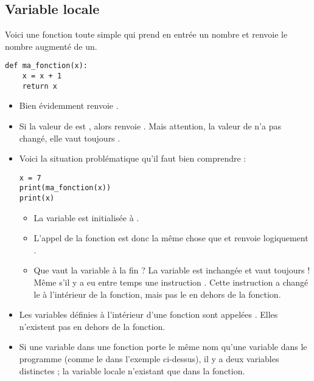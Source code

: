 \documentclass[11pt,class=report,crop=false]{standalone}
\begin{document}
\subsection{Variable locale}


Voici une fonction toute simple qui prend en entrée un nombre et renvoie le nombre augmenté de un.
\begin{center}
\begin{lstlisting}
def ma_fonction(x):
    x = x + 1
    return x
\end{lstlisting}
\end{center}

\begin{itemize}
  \item Bien évidemment  renvoie .
  
  \item Si la valeur de  est , alors  renvoie . Mais attention, la valeur de  n'a pas changé, elle vaut toujours .
  
  \item Voici la situation problématique qu'il faut bien comprendre :
 \begin{center}
\begin{lstlisting}
x = 7
print(ma_fonction(x))
print(x)
\end{lstlisting}
\end{center}
  \begin{itemize}
    \item La variable  est initialisée à .
    
    \item L'appel de la fonction  est donc la même chose que 
      et renvoie logiquement .
     
    
    \item Que vaut la variable  à la fin ? La variable  est inchangée et vaut toujours  ! Même s'il y a eu entre temps une instruction . Cette instruction a changé le  à l'intérieur de la fonction, mais  pas le  en dehors de la fonction.
\end{itemize}   
\end{itemize} 
 
\bigskip

\begin{itemize}
  \item Les variables définies à l'intérieur d'une fonction sont appelées 
. 
Elles n'existent pas en dehors de la fonction.
  
  \item Si une variable dans une fonction porte le même nom qu'une variable dans le programme (comme le  dans l'exemple ci-dessus),  il y a deux variables distinctes ; la variable locale n'existant que dans la fonction.
  
\end{itemize}
\end{document}
